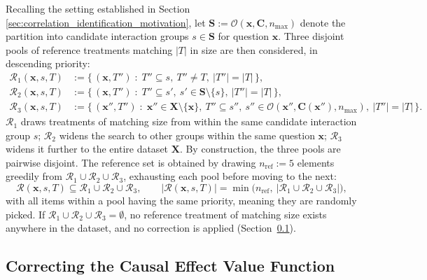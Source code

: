 Recalling the setting established in Section \ref{sec:correlation_identification_motivation}, let $\mathbf{S} := \mathcal{O}(\mathbf{x}, \mathbf{C}, n_{\max})$ denote the partition into candidate interaction groups $s \in \mathbf{S}$ for question $\mathbf{x}$. Three disjoint pools of reference treatments matching $|T|$ in size are then considered, in descending priority:
\begin{align}
	\mathcal{R}_1(\mathbf{x},s,T) & := \big\{\, (\mathbf{x},T'') \;:\; T''\subseteq s,\ T''\neq T,\ |T''|=|T| \,\big\}, \label{eq:R_1}
	\\
	\mathcal{R}_2(\mathbf{x},s,T) & := \big\{\, (\mathbf{x},T'') \;:\; T''\subseteq s',\ s'\in \mathbf{S}\setminus\{s\},\ |T''|=|T| \,\big\}, \label{eq:R_2}
	\\
	\mathcal{R}_3(\mathbf{x},s,T) & := \big\{\, (\mathbf{x}'',T'') \;:\; \mathbf{x}''\in \mathbf{X}\setminus\{\mathbf{x}\},\ T''\subseteq s'',\ s''\in \mathcal{O}(\mathbf{x}'',\mathbf{C}(\mathbf{x}''),n_{\max}),\ |T''|=|T| \,\big\}. \label{eq:R_3}
\end{align}
$\mathcal{R}_1$ draws treatments of matching size from within the same candidate interaction group $s$; $\mathcal{R}_2$ widens the search to other groups within the same question $\mathbf{x}$; $\mathcal{R}_3$ widens it further to the entire dataset $\mathbf{X}$. By construction, the three pools are pairwise disjoint. The reference set is obtained by drawing $n_{\mathrm{ref}} := 5$ elements greedily from $\mathcal{R}_1 \cup \mathcal{R}_2 \cup \mathcal{R}_3$, exhausting each pool before moving to the next:
\begin{equation}
	\label{eq:reference_set}
	\mathcal{R}(\mathbf{x},s,T) \subseteq \mathcal{R}_1\cup\mathcal{R}_2\cup\mathcal{R}_3, \qquad |\mathcal{R}(\mathbf{x},s,T)| = \min\big(n_{\mathrm{ref}},\ |\mathcal{R}_1\cup\mathcal{R}_2\cup\mathcal{R}_3|\big),
\end{equation}
with all items within a pool having the same priority, meaning they are randomly picked. If $\mathcal{R}_1\cup\mathcal{R}_2\cup\mathcal{R}_3=\emptyset$, no reference treatment of matching size exists anywhere in the dataset, and no correction is applied (Section~\ref{sec:corrected_value_function}).

\subsection{Correcting the Causal Effect Value Function}
\label{sec:corrected_value_function}

